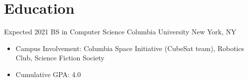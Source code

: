 \documentclass[letterpaper]{moderncv}        %
\begin{document}
\makecvtitle
\vspace*{-5mm} %
\section{Education}
\cventry
{Expected 2021}
{BS in Computer Science}
{Columbia University}
{New York, NY}
{}
{\begin{itemize}%
	\item Campus Involvement: Columbia Space Initiative (CubeSat team), Robotics Club, Science Fiction Society
         \item Cumulative GPA: 4.0
	\end{itemize}}
\end{document}
